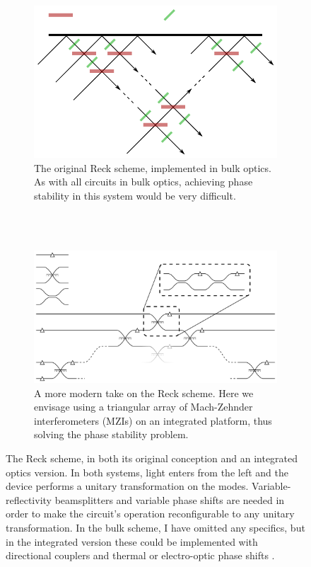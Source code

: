 \begin{figure}
  \begin{subfigure}{\textwidth}
    \centering
    \includegraphics{figures/reck_original}
    \caption{The original Reck scheme, implemented in bulk optics. As with all
    circuits in bulk optics, achieving phase stability in this system would be
    very difficult.}
    \label{fig:ReckOriginal}
  \end{subfigure} \\
  \vspace{1cm} \\
  \begin{subfigure}{\textwidth}
    \centering
    \includegraphics{figures/reck_general}
    \caption{A more modern take on the Reck scheme. Here we envisage using
    a triangular array of
    Mach-Zehnder interferometers (MZIs) on an integrated platform, thus solving
    the phase stability problem.}
    \label{fig:ReckGeneral}
  \end{subfigure}
  \caption[The Reck scheme, in both its original conception and an integrated
  optics version]{The Reck scheme, in both its original conception and an
  integrated
  optics version. In both systems, light enters from the left and the device
  performs a unitary transformation on the modes. Variable-reflectivity
  beamsplitters and variable phase shifts are needed in order to make the
  circuit's operation reconfigurable to any unitary transformation. In the
  bulk scheme, I have omitted any specifics, but in the integrated version these
  could be implemented with directional couplers and thermal or electro-optic
  phase shifts .}
  \label{fig:ReckScheme}
\end{figure}

